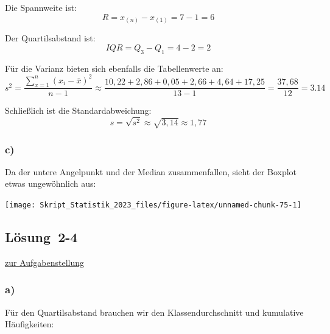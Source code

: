 \documentclass[
  11pt,
  ngerman,
  a4paper,
]{report}
\begin{document}
Die Spannweite ist: \[R=x_{(n)}-x_{(1)}=7-1=6\]

Der Quartilsabstand ist: \[\mathit{IQR}=Q_3-Q_1=4-2=2\]

Für die Varianz bieten sich ebenfalls die Tabellenwerte an: \[s^2=\frac{\sum\limits_{x=1}^n(x_i-\bar{x})^2}{n-1}\approx\frac{10,22+ 2,86+ 0,05+ 2,66+ 4,64+17,25}{13-1}=\frac{37,68}{12}=3.14\]

Schließlich ist die Standardabweichung: \[s=\sqrt{s^2}\approx\sqrt{3,14}\approx1,77\]

\hypertarget{c-4}{%
\subsubsection{c)}\label{c-4}}

Da der untere Angelpunkt und der Median zusammenfallen, sieht der Boxplot etwas ungewöhnlich aus:

\begin{center}\texttt{[image: Skript\_Statistik\_2023\_files/figure-latex/unnamed-chunk-75-1]} \end{center}

\hypertarget{loesung-2-4}{%
\subsection{Lösung~2-4}\label{loesung-2-4}}

\protect\hyperlink{aufgabe-2-4}{zur Aufgabenstellung}

\hypertarget{a-5}{%
\subsubsection{a)}\label{a-5}}

Für den Quartilsabstand brauchen wir den Klassendurchschnitt und kumulative Häufigkeiten:
\end{document}
